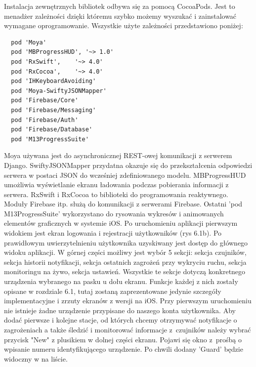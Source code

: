 Instalacja zewnętrznych bibliotek odbywa się za pomocą CocoaPods. Jest to menadżer zależności dzięki któremu szybko możemy wyszukać i zainstalować wymagane oprogramowanie. Wszystkie użyte zależności przedstawiono poniżej: 
\begin{verbatim}
  pod 'Moya'
  pod 'MBProgressHUD', '~> 1.0'
  pod 'RxSwift',    '~> 4.0'
  pod 'RxCocoa',    '~> 4.0'
  pod 'IHKeyboardAvoiding'
  pod 'Moya-SwiftyJSONMapper'
  pod 'Firebase/Core'
  pod 'Firebase/Messaging'
  pod 'Firebase/Auth'
  pod 'Firebase/Database'
  pod 'M13ProgressSuite'
\end{verbatim}
Moya używana jest do asynchronicznej REST-owej komunikacji z serwerem Django. SwiftyJSONMapper przydatna okazuje się do przekształcenia odpowiedzi serwera w postaci JSON do wcześniej zdefiniowanego modelu. MBProgressHUD umożliwia wyświetlanie ekranu ładowania podczas pobierania informacji z serwera. RxSwift i RxCocoa to biblioteki do programowania reaktywnego. Moduły Firebase itp. służą do komunikacji z serwerami Firebase. Ostatni 'pod M13ProgressSuite' wykorzystano do rysowania wykresów i animowanych elementów graficznych w systemie iOS.
Po uruchomieniu aplikacji pierwszym widokiem jest ekran logowania i rejestracji użytkowników (rys 6.1b). 
Po prawidłowym uwierzytelnieniu użytkownika uzyskiwany jest dostęp do głównego widoku aplikacji. W górnej części możliwy jest wybór 5 sekcji:
sekcja czujników, sekcja historii notyfikacji, sekcja ostatnich zagrożeń przy wykryciu ruchu, sekcja monitoringu na żywo, sekcja ustawień. Wszystkie te sekcje dotyczą konkretnego urządzenia wybranego na pasku u dołu ekranu. Funkcje każdej z nich zostały opisane w rozdziale 6.1, tutaj zostaną zaprezentowane jedynie szczegóły implementacyjne i zrzuty ekranów z wersji na iOS. Przy pierwszym uruchomieniu nie istnieje żadne urządzenie przypisane do naszego konta użytkownika. Aby dodać pierwsze i kolejne stacje, od których chcemy otrzymywać notyfikacje o zagrożeniach a także śledzić i monitorować informacje z~czujników należy wybrać przycisk "New" z plusikiem w dolnej części ekranu. Pojawi się okno z~prośbą o wpisanie numeru identyfikującego urządzenie. Po chwili dodany 'Guard' będzie widoczny w na liście.


